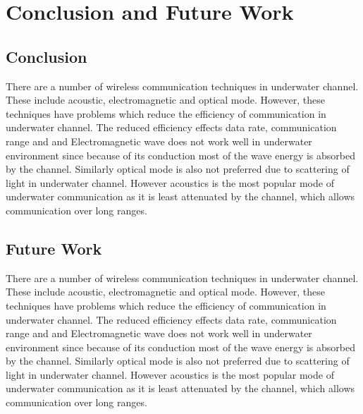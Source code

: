 
\section{Conclusion and Future Work}


\subsection{Conclusion }

There are a number of wireless communication techniques in underwater channel. These include acoustic, electromagnetic and optical mode. However, these techniques have problems which reduce the efficiency of communication in underwater channel. The reduced efficiency effects data rate, communication range and and Electromagnetic wave does not work well in underwater environment since because of its conduction most of the wave energy is absorbed by the channel.
Similarly optical mode is also not preferred due to scattering of light in underwater channel.
However acoustics is the most popular mode of underwater communication as it is least attenuated by the channel, which allows communication over long ranges. 

\subsection{Future Work }

There are a number of wireless communication techniques in underwater channel. These include acoustic, electromagnetic and optical mode. However, these techniques have problems which reduce the efficiency of communication in underwater channel. The reduced efficiency effects data rate, communication range and and Electromagnetic wave does not work well in underwater environment since because of its conduction most of the wave energy is absorbed by the channel.
Similarly optical mode is also not preferred due to scattering of light in underwater channel.
However acoustics is the most popular mode of underwater communication as it is least attenuated by the channel, which allows communication over long ranges. 

